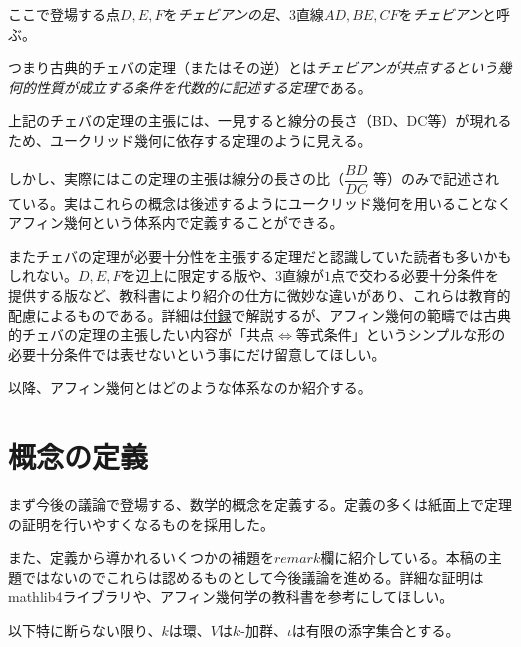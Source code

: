\documentclass[a4paper,12pt]{bxjsbook}
\newlength{\customindent}
\newenvironment{body}{
  \par
  \begingroup
  \setlength{\leftskip}{\customindent}
  \setlength{\rightskip}{0pt}
  \setlength{\parindent}{1em}
  \setlength{\displayindent}{\customindent}
  \setlength{\displaywidth}{\dimexpr\linewidth-\customindent\relax}
}{
  \par
  \endgroup
}
\theoremstyle{theorem}
\begin{document}
    \begin{body}
        \indent ここで登場する点$D,E,F$を\emph{チェビアンの足}、$3$直線$AD,BE,CF$を\emph{チェビアン}と呼ぶ。

        \indent つまり古典的チェバの定理（またはその逆）とは\emph{チェビアンが共点するという幾何的性質が成立する条件を代数的に記述する定理}である。

        \indent 上記のチェバの定理の主張には、一見すると線分の長さ（BD、DC等）が現れるため、ユークリッド幾何に依存する定理のように見える。

        \indent しかし、実際にはこの定理の主張は線分の長さの比（$\dfrac{BD}{DC}$ 等）のみで記述されている。実はこれらの概念は後述するようにユークリッド幾何を用いることなくアフィン幾何という体系内で定義することができる。

        \indent またチェバの定理が必要十分性を主張する定理だと認識していた読者も多いかもしれない。$D,E,F$を辺上に限定する版や、$3$直線が$1$点で交わる必要十分条件を提供する版など、教科書により紹介の仕方に微妙な違いがあり、これらは教育的配慮によるものである。詳細は\hyperref[appendix:classical-ceva-version]{付録}で解説するが、アフィン幾何の範疇では古典的チェバの定理の主張したい内容が「共点$⇔$等式条件」というシンプルな形の必要十分条件では表せないという事にだけ留意してほしい。

        \indent 以降、アフィン幾何とはどのような体系なのか紹介する。
    \end{body}

    \section{概念の定義}
    \begin{body}
        \indent まず今後の議論で登場する、数学的概念を定義する。定義の多くは紙面上で定理の証明を行いやすくなるものを採用した。

        \indent また、定義から導かれるいくつかの補題を$remark$欄に紹介している。本稿の主題ではないのでこれらは認めるものとして今後議論を進める。詳細な証明はmathlib4ライブラリや、アフィン幾何学の教科書を参考にしてほしい。

        \indent 以下特に断らない限り、$k$は環、$V$は$k$-加群、$\iota$は有限の添字集合とする。
    \end{body}
\end{document}
